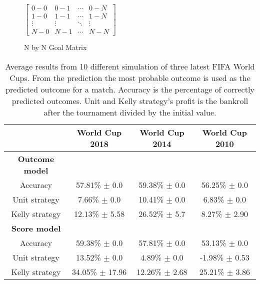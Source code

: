 

\begin{figure}
    $\begin{bmatrix}
    0-0 & 0-1 & \cdots & 0-N \\
    1-0 & 1-1 & \cdots   &1-N \\
    \vdots & \vdots   & \ddots & \vdots \\
    N-0 & N-1 & \cdots & N-N\end{bmatrix}$
\caption{N by N Goal Matrix}
\end{figure}

\begin{table}
    \caption{Average results from 10 different simulation of three latest FIFA World Cups. From the prediction the most probable outcome is used as the predicted outcome for a match. Accuracy is the percentage of correctly predicted outcomes. Unit and Kelly strategy's profit is the bankroll after the tournament divided by the initial value.}
    \begin{tabular}{ | c |c| c | c |}
    \hline
    & World Cup 2018 & World Cup 2014 & World Cup 2010 \\
    \hline
    \textbf{Outcome model} \\
    \hline
    Accuracy & 57.81\% $\pm$ 0.0 & 59.38\% $\pm$  0.0 & 56.25\% $\pm$ 0.0 \\
    Unit strategy& 7.66\% $\pm$ 0.0 & 10.41\% $\pm$ 0.0 & 6.83\% $\pm$ 0.0 \\
    Kelly strategy& 12.13\% $\pm$ 5.58 & 26.52\% $\pm$ 5.7 & 8.27\% $\pm$ 2.90 \\
    \hline
    \textbf{Score model} \\
    \hline
    Accuracy & 59.38\% $\pm$ 0.0 & 57.81\% $\pm$ 0.0 & 53.13\% $\pm$ 0.0 \\
    Unit strategy & 13.52\% $\pm$ 0.0 & 4.89\%  $\pm$ 0.0 & -1.98\% $\pm$ 0.53 \\
    Kelly strategy & 34.05\% $\pm$ 17.96 & 12.26\% $\pm$ 2.68 & 25.21\% $\pm$ 3.86 \\
    \hline
   \end{tabular}
\end{table}


